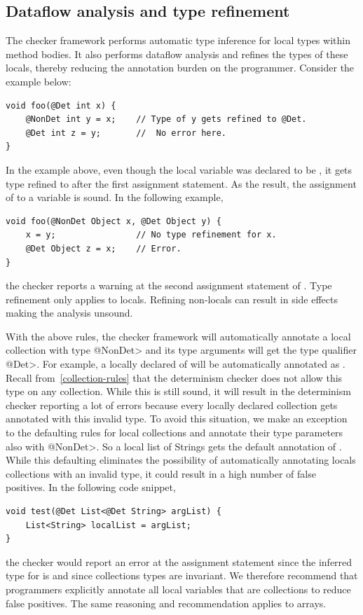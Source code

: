 \subsection{Dataflow analysis and type refinement}\label{dataflow}
The checker framework performs automatic type inference for local types within method bodies.
It also performs dataflow analysis and refines the types of these locals, thereby reducing the annotation burden 
on the programmer. Consider the example below:
\begin{verbatim}
void foo(@Det int x) {
    @NonDet int y = x;    // Type of y gets refined to @Det.
    @Det int z = y;       //  No error here.
}
\end{verbatim}
In the example above, even though the local variable  was declared to be , it gets
type refined to  after the first assignment statement. As the result, the assignment of 
to a  variable  is sound. In the following example,
\begin{verbatim}
void foo(@NonDet Object x, @Det Object y) {
    x = y;                // No type refinement for x.
    @Det Object z = x;    // Error.
}
\end{verbatim}
the checker reports a warning at the second assignment statement of . Type refinement only applies to locals. Refining non-locals can result in side effects making the analysis unsound.

With the above rules, the checker framework will automatically annotate a local collection with type \<@NonDet> and its
type arguments will get the type qualifier \<@Det>. For example, a locally declared  of  will be automatically annotated
as . Recall from~\ref{collection-rules} that the determinism checker does not allow this type on
any collection. While this is still sound, it will result in the determinism checker reporting a lot of errors because every locally declared 
collection gets annotated with this invalid type. To avoid this situation, we make an exception to the defaulting rules for local collections
and annotate their type parameters also with \<@NonDet>. So a local list of Strings gets the default annotation of . While this defaulting eliminates the possibility of automatically annotating locals collections with an invalid
type, it could result in a high number of false positives. In the following code snippet,
\begin{verbatim}
void test(@Det List<@Det String> argList) {
    List<String> localList = argList;
}    
\end{verbatim}
the checker would report an error at the assignment statement since the inferred type for  is 
 and since collections types are invariant.
We therefore recommend that programmers explicitly annotate
all local variables that are collections to reduce false positives. The same reasoning and recommendation applies to arrays.

